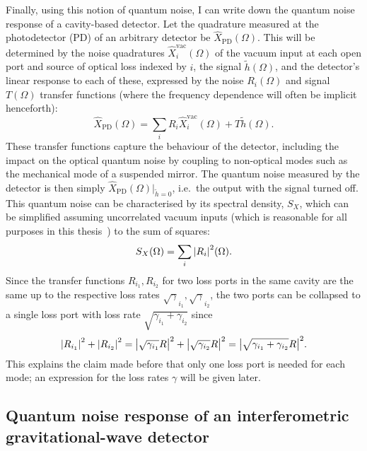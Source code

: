 Finally, using this notion of quantum noise, I can write down the quantum noise response of a cavity-based detector. %
Let the quadrature measured at the photodetector (PD) of an arbitrary detector be $\hat{X}_\text{PD}(\Omega)$. This will be determined by the noise quadratures $\hat{X}_i^\text{vac}(\Omega)$ of the vacuum input at each open port and source of optical loss indexed by $i$, the signal $\tilde{h}(\Omega)$, and the detector's linear response to each of these, expressed by the noise $R_i(\Omega)$ and signal $T(\Omega)$ transfer functions (where the frequency dependence will often be implicit henceforth): \begin{equation}\hat X_\text{PD}(\Omega)=\sum_i R_i \hat X_i^\text{vac}(\Omega) + T \tilde h(\Omega).\end{equation}
These transfer functions capture the behaviour of the detector, including the impact on the optical quantum noise by coupling to non-optical modes such as the mechanical mode of a suspended mirror. %
The quantum noise measured by the detector is then simply $\hat X_\text{PD}(\Omega)|_{\tilde h=0}$, i.e.\ the output with the signal turned off. This quantum noise can be characterised by its spectral density, $S_X$, which can be simplified assuming uncorrelated vacuum inputs (which is reasonable for all purposes in this thesis~\cite{}) to the sum of squares: \begin{equation}S_X(\Omega)=\sum_i \abs{R_i}^2(\Omega).\end{equation} 
Since the transfer functions $R_{i_1}, R_{i_2}$ for two loss ports in the same cavity are the same up to the respective loss rates $\sqrt\gamma_{i_1}, \sqrt\gamma_{i_2}$, the two ports can be collapsed to a single loss port with loss rate $\sqrt{\gamma_{i_1}+\gamma_{i_2}}$ since \begin{equation}\abs{R_{i_1}}^2+\abs{R_{i_2}}^2=\abs{\sqrt{\gamma_{i_1}}R}^2+\abs{\sqrt{\gamma_{i_2}}R}^2=\abs{\sqrt{\gamma_{i_1}+\gamma_{i_2}}R}^2.\end{equation} This explains the claim made before that only one loss port is needed for each mode; an expression for the loss rates $\gamma$ will be given later.



\subsection{Quantum noise response of an interferometric gravitational-wave detector}

